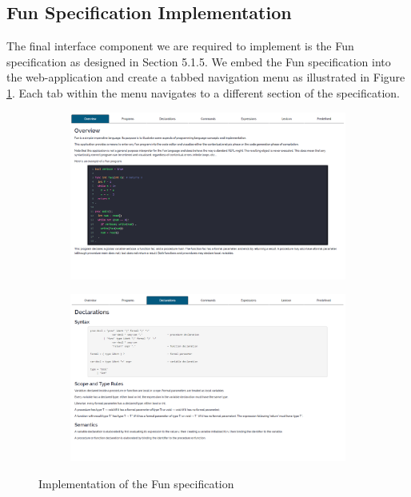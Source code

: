 \documentclass{l4proj}
\begin{document}
\subsection{Fun Specification Implementation}
The final interface component we are required to implement is the Fun specification as designed in Section 5.1.5. We embed the Fun specification into the web-application and create a tabbed navigation menu as illustrated in Figure \ref{fig:implspec}. Each tab within the menu navigates to a different section of the specification.
\begin{figure}[h]
	\centering
	\begin{subfigure}[b]{.5\textwidth}
		\centering
		\includegraphics[width=.8\linewidth]{images/implspec1.PNG}
	\end{subfigure}%
	\begin{subfigure}[b]{.5\textwidth}
		\centering
		\includegraphics[width=.8\linewidth]{images/implspec2.PNG}
	\end{subfigure}
	\caption{Implementation of the Fun specification}
	\label{fig:implspec}	
\end{figure}
\end{document}
